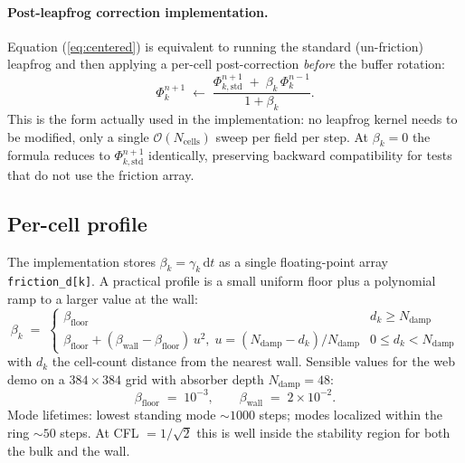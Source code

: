 \documentclass[11pt,a4paper]{article}
\newcommand{\order}[1]{\mathcal{O}(#1)}
\newcommand{\dd}{\mathrm{d}}
\begin{document}
\paragraph{Post-leapfrog correction implementation.}  Equation
(\ref{eq:centered}) is equivalent to running the standard (un-friction)
leapfrog and then applying a per-cell post-correction \emph{before}
the buffer rotation:
\begin{equation}
  \Phi^{n+1}_k \;\leftarrow\; \frac{\Phi^{n+1}_{k,\text{std}}
                                    \;+\; \beta_k\,\Phi^{n-1}_k}{1 + \beta_k}.
  \label{eq:centered_post}
\end{equation}
This is the form actually used in the implementation: no leapfrog
kernel needs to be modified, only a single $\order{N_\text{cells}}$
sweep per field per step.  At $\beta_k = 0$ the formula reduces to
$\Phi^{n+1}_{k,\text{std}}$ identically, preserving backward
compatibility for tests that do not use the friction array.

\subsection{Per-cell profile}

The implementation stores $\beta_k = \gamma_k\,\dd t$ as a single
floating-point array \texttt{friction\_d[k]}.  A practical profile is
a small uniform floor plus a polynomial ramp to a larger value at
the wall:
\begin{equation}
  \beta_k \;=\;
  \begin{cases}
    \beta_\text{floor} & d_k \ge N_\text{damp} \\
    \beta_\text{floor} + (\beta_\text{wall} - \beta_\text{floor})\,u^2,\; u = (N_\text{damp} - d_k)/N_\text{damp} & 0 \le d_k < N_\text{damp}
  \end{cases}
\end{equation}
with $d_k$ the cell-count distance from the nearest wall.  Sensible
values for the web demo on a $384 \times 384$ grid with absorber
depth $N_\text{damp} = 48$:
\begin{equation}
  \beta_\text{floor} \;=\; 10^{-3},
  \qquad
  \beta_\text{wall}  \;=\; 2 \times 10^{-2}.
\end{equation}
Mode lifetimes: lowest standing mode $\sim 1000$ steps; modes
localized within the ring $\sim 50$ steps.  At
CFL $= 1/\sqrt{2}$ this is well inside the stability region for both
the bulk and the wall.

\end{document}
